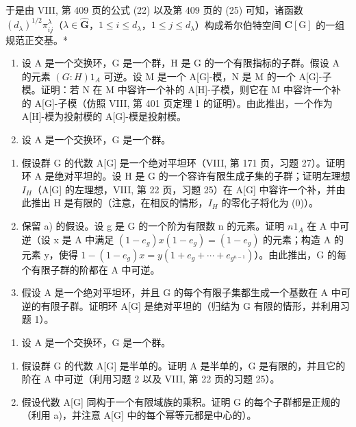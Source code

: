 于是由 VIII, 第 409 页的公式 (22) 以及第 409 页的 (25) 可知，诸函数 \((d_{\lambda})^{1 / 2}\pi_{ij}^{\lambda}\)（\(\lambda \in \widehat{\mathbf{G}}\)，\(1\leqslant i\leqslant d_{\lambda}\)，\(1\leqslant j\leqslant d_{\lambda}\)）构成希尔伯特空间 \(\mathbf{C}[\mathrm{G}]\) 的一组规范正交基。*


\begin{enumerate}
\def\labelenumi{\arabic{enumi})}
\item
  设 A 是一个交换环，G 是一个群，H 是 G 的一个有限指标的子群。假设 A 的元素 \((G:H)1_{A}\) 可逆。设 M 是一个 A{[}G{]}-模，N 是 M 的一个 A{[}G{]}-子模。证明：若 N 在 M 中容许一个补的 A{[}H{]}-子模，则它在 M 中容许一个补的 A{[}G{]}-子模（仿照 VIII, 第 401 页定理 1 的证明）。由此推出，一个作为 A{[}H{]}-模为投射模的 A{[}G{]}-模是投射模。
\item
  设 A 是一个交换环，G 是一个群。
\end{enumerate}

\begin{enumerate}
\def\labelenumi{\alph{enumi})}
\item
  假设群 G 的代数 A{[}G{]} 是一个绝对平坦环（VIII, 第 171 页，习题 27）。证明环 A 是绝对平坦的。设 H 是 G 的一个容许有限生成子集的子群；证明左理想 \(I_{H}\)（A{[}G{]} 的左理想，VIII, 第 22 页，习题 25）在 A{[}G{]} 中容许一个补，并由此推出 H 是有限的（注意，在相反的情形，\(I_{H}\) 的零化子将化为 (0)）。
\item
  保留 a) 的假设。设 g 是 G 的一个阶为有限数 n 的元素。证明 \(n1_{A}\) 在 A 中可逆（设 x 是 A 中满足 \((1-e_{g})x(1-e_{g})=(1-e_{g})\) 的元素；构造 A 的元素 y，使得 \(1-(1-e_{g})x=y(1+e_{g}+\cdots+e_{g^{n-1}})\)）。由此推出，G 的每个有限子群的阶都在 A 中可逆。
\item
  假设 A 是一个绝对平坦环，并且 G 的每个有限子集都生成一个基数在 A 中可逆的有限子群。证明环 A{[}G{]} 是绝对平坦的（归结为 G 有限的情形，并利用习题 1）。
\end{enumerate}

\begin{enumerate}
\def\labelenumi{\arabic{enumi})}
\setcounter{enumi}{2}
\tightlist
\item
  设 A 是一个交换环，G 是一个群。
\end{enumerate}

\begin{enumerate}
\def\labelenumi{\alph{enumi})}
\item
  假设群 G 的代数 A{[}G{]} 是半单的。证明 A 是半单的，G 是有限的，并且它的阶在 A 中可逆（利用习题 2 以及 VIII, 第 22 页的习题 25）。
\item
  假设代数 A{[}G{]} 同构于一个有限域族的乘积。证明 G 的每个子群都是正规的（利用 a)，并注意 A{[}G{]} 中的每个幂等元都是中心的）。
\end{enumerate}

